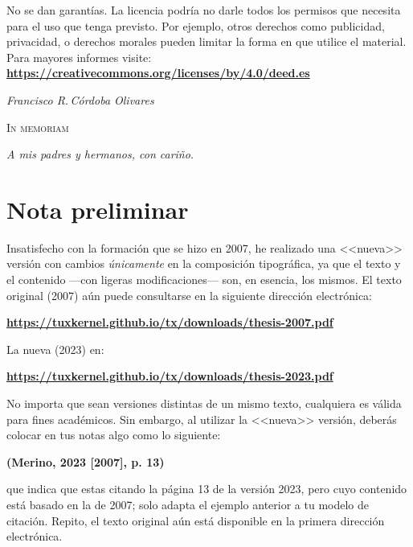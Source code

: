 \documentclass[14pt,twoside,final]{extbook} %
\begin{document}
\begin{scriptsize}
\begin{flushleft}
\begin{minipage}{7.5cm}
\noindent No se dan garantías. La licencia podría no darle todos los permisos que necesita para el uso que tenga previsto. Por ejemplo, otros derechos como publicidad, privacidad, o derechos morales pueden limitar la forma en que utilice el material. \\

\noindent Para mayores informes visite: \\ 

\textbf{\url{https://creativecommons.org/licenses/by/4.0/deed.es}}
\end{minipage}
\end{flushleft}
\end{scriptsize}
\newpage
\pagestyle{empty}
\vspace*{42pt}
\begin{flushright}
\textit{Francisco R.\,Córdoba Olivares}
\end{flushright}
\begin{flushright}
\textsc{In memoriam}
\vspace*{28pt}
\end{flushright}
\begin{flushright}
\textit{A mis padres y hermanos, con cariño.}
\end{flushright}
\newpage
\pagestyle{empty}
\newpage
\pagestyle{empty}
\chapter*{Nota preliminar}\label{ch:nota-preliminar}
Insatisfecho con la formación que se hizo en 2007, he realizado una <<nueva>> versión con cambios \emph{únicamente} en la composición tipográfica, ya que el texto y el contenido ---con ligeras modificaciones--- son, en esencia, los mismos. El texto original (2007) aún puede consultarse en la siguiente dirección electrónica:
\begin{center}
\href{https://tuxkernel.github.io/tx/downloads/thesis-2007.pdf}{\bfseries https://tuxkernel.github.io/tx/downloads/thesis-2007.pdf}
\end{center}
La nueva (2023) en:
\begin{center}
\href{https://tuxkernel.github.io/tx/downloads/thesis-2023.pdf}{\bfseries https://tuxkernel.github.io/tx/downloads/thesis-2023.pdf}
\end{center}
No importa que sean versiones distintas de un mismo texto, cualquiera es válida para fines académicos. Sin embargo, al utilizar la <<nueva>> versión, deberás colocar en tus notas algo como lo siguiente:
\begin{center}
\bfseries (Merino, 2023 [2007], p. 13)
\end{center}
\noindent que indica que estas citando la página 13 de la versión 2023, pero cuyo contenido está basado en la de 2007; solo adapta el ejemplo anterior a tu modelo de citación. Repito, el texto original aún está disponible en la primera dirección electrónica.
\end{document}
